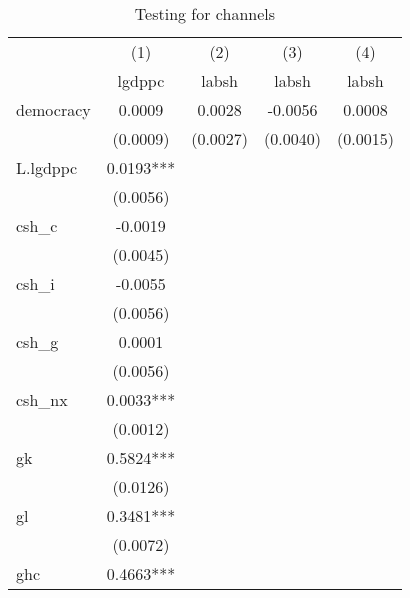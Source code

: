 \begin{table}[htbp]\centering
\def\sym#1{\ifmmode^{#1}\else\(^{#1}\)\fi}
\caption{Testing for channels \label{tab:regression3}}
\begin{tabular}{l*{4}{c}}
\hline\hline
            &\multicolumn{1}{c}{(1)}&\multicolumn{1}{c}{(2)}&\multicolumn{1}{c}{(3)}&\multicolumn{1}{c}{(4)}\\
            &\multicolumn{1}{c}{lgdppc}&\multicolumn{1}{c}{labsh}&\multicolumn{1}{c}{labsh}&\multicolumn{1}{c}{labsh}\\
\hline
democracy   &      0.0009   &      0.0028   &     -0.0056   &      0.0008   \\
            &    (0.0009)   &    (0.0027)   &    (0.0040)   &    (0.0015)   \\
[1em]
L.lgdppc    &      0.0193***&               &               &               \\
            &    (0.0056)   &               &               &               \\
[1em]
csh\_c       &     -0.0019   &               &               &               \\
            &    (0.0045)   &               &               &               \\
[1em]
csh\_i       &     -0.0055   &               &               &               \\
            &    (0.0056)   &               &               &               \\
[1em]
csh\_g       &      0.0001   &               &               &               \\
            &    (0.0056)   &               &               &               \\
[1em]
csh\_nx      &      0.0033***&               &               &               \\
            &    (0.0012)   &               &               &               \\
[1em]
gk          &      0.5824***&               &               &               \\
            &    (0.0126)   &               &               &               \\
[1em]
gl          &      0.3481***&               &               &               \\
            &    (0.0072)   &               &               &               \\
[1em]
ghc         &      0.4663***&               &               &               \\

\end{tabular}
\end{table}
